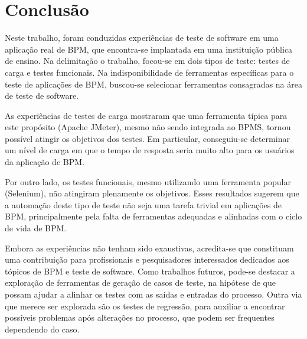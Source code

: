 \documentclass[12pt]{article}
\begin{document}
%





\section{Conclusão}


Neste trabalho, foram conduzidas experiências de teste de software em uma aplicação real de BPM, que encontra-se implantada em uma instituição pública de ensino. Na delimitação o trabalho, focou-se em dois tipos de teste: testes de carga e testes funcionais. Na indisponibilidade de ferramentas específicas para o teste de aplicações de BPM, buscou-se selecionar ferramentas consagradas na área de teste de software.


As experiências de testes de carga mostraram que uma ferramenta típica para este propósito (Apache JMeter), mesmo não sendo integrada ao BPMS, tornou possível atingir os objetivos dos testes. Em particular, conseguiu-se determinar um nível de carga em que o tempo de resposta seria muito alto para os usuários da aplicação de BPM.


Por outro lado, os testes funcionais, mesmo utilizando uma ferramenta popular (Selenium), não atingiram plenamente os objetivos. Esses resultados sugerem que a automação deste tipo de teste não seja uma tarefa trivial em aplicações de BPM, principalmente pela falta de ferramentas adequadas e alinhadas com o ciclo de vida de BPM.


Embora as experiências não tenham sido exaustivas, acredita-se que constituam uma contribuição para profissionais e pesquisadores interessados dedicados aos tópicos de BPM e teste de software. Como trabalhos futuros, pode-se destacar a exploração de ferramentas de geração de casos de teste, na hipótese de que possam ajudar a alinhar os testes com as saídas e entradas do processo. Outra via que merece ser explorada são os testes de regressão, para auxiliar a encontrar possíveis problemas após alterações no processo, que podem ser frequentes dependendo do caso.






\end{document}
